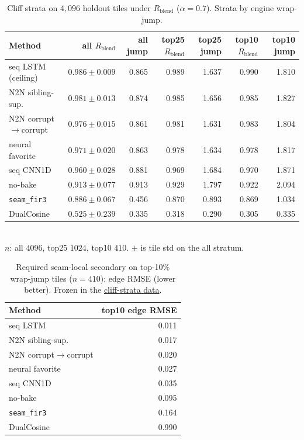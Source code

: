 \begin{table}[t]
  \centering
  \caption{Cliff strata on $4{,}096$ holdout tiles under $R_{\mathrm{blend}}$ ($\alpha{=}0.7$). Strata by engine wrap-jump.}
  \label{tab:cliff-strata}
  \setlength{\tabcolsep}{2.5pt}
  \begin{tabular}{@{}lrrrrrr@{}}
    \toprule
    Method & all $R_{\mathrm{blend}}$ & all jump & top25 $R_{\mathrm{blend}}$ & top25 jump & top10 $R_{\mathrm{blend}}$ & top10 jump \\
    \midrule
    seq LSTM (ceiling) & $0.986\pm0.009$ & 0.865 & 0.989 & 1.637 & 0.990 & 1.810 \\
    N2N sibling-sup. & $0.981\pm0.013$ & 0.874 & 0.985 & 1.656 & 0.985 & 1.827 \\
    N2N corrupt$\to$corrupt & $0.976\pm0.015$ & 0.861 & 0.981 & 1.631 & 0.983 & 1.804 \\
    neural favorite & $0.971\pm0.020$ & 0.863 & 0.978 & 1.634 & 0.978 & 1.817 \\
    seq CNN1D & $0.960\pm0.028$ & 0.881 & 0.969 & 1.684 & 0.970 & 1.871 \\
    no-bake & $0.913\pm0.077$ & 0.913 & 0.929 & 1.797 & 0.922 & 2.094 \\
    \texttt{seam\_fir3} & $0.886\pm0.067$ & 0.456 & 0.870 & 0.893 & 0.869 & 1.034 \\
    DualCosine & $0.525\pm0.239$ & 0.335 & 0.318 & 0.290 & 0.305 & 0.335 \\
    \bottomrule
  \end{tabular}\\[0.3em]
  {\footnotesize $n$: all $4096$, top25 $1024$, top10 $410$. $\pm$ is tile std on the all stratum.}
\end{table}

\begin{table}[t]
  \centering
  \caption{Required seam-local secondary on top-10\% wrap-jump tiles ($n{=}410$): edge RMSE (lower better). Frozen in the \href{https://github.com/reeldemo/denoise-opt-meta/blob/master/paper/Unsupervised_Wrap-Discontinuity_Repair_in_Wavetable_Synthesis_via_Hybrid_GA-PPO_Meta-Search_v12/figures/cliff_strata.json}{cliff-strata data}.}
  \label{tab:cliff-edge-rmse}
  \setlength{\tabcolsep}{3pt}
  \begin{tabular}{@{}lr@{}}
    \toprule
    Method & top10 edge RMSE \\
    \midrule
    seq LSTM & 0.011 \\
    N2N sibling-sup. & 0.017 \\
    N2N corrupt$\to$corrupt & 0.020 \\
    neural favorite & 0.027 \\
    seq CNN1D & 0.035 \\
    no-bake & 0.095 \\
    \texttt{seam\_fir3} & 0.164 \\
    DualCosine & 0.990 \\
    \bottomrule
  \end{tabular}
\end{table}

